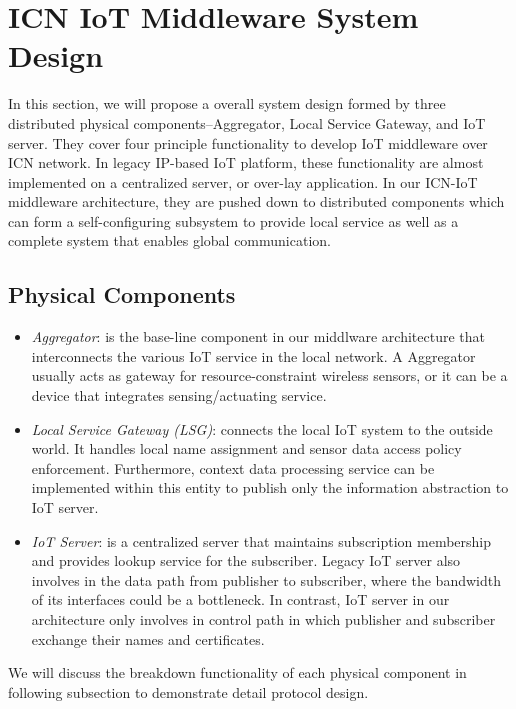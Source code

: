 \section{ICN IoT Middleware System Design}
In this section, we will propose a overall system design formed by three distributed physical components--Aggregator, Local Service Gateway, and IoT server. They cover four principle functionality to develop IoT middleware over ICN network. In legacy IP-based IoT platform, these functionality are almost implemented on a centralized server, or over-lay application. In our ICN-IoT middleware architecture, they are pushed down to distributed components which can form a self-configuring subsystem to provide local service as well as a complete system that enables global communication. 
\subsection{Physical Components}
\begin{itemize}
\vspace{-2pt}\item{\em Aggregator}:
is the base-line component in our middlware architecture that interconnects the various IoT service in the local network. A Aggregator usually acts as gateway for resource-constraint wireless sensors, or it can be a device that integrates sensing/actuating service. 
\vspace{-2pt}\item{\em Local Service Gateway (LSG)}:
connects the local IoT system to the outside world. It handles local name assignment and sensor data access policy enforcement. Furthermore, context data processing service can be implemented within this entity to publish only the information abstraction to IoT server.    
\vspace{-2pt}\item{\em IoT Server}:
is a centralized server that maintains subscription membership and provides lookup service for the subscriber. Legacy IoT server also involves in the data path from publisher to subscriber, where the bandwidth of its interfaces could be a bottleneck. In contrast, IoT server in our architecture only involves in control path in which publisher and subscriber exchange their names and certificates.  
\end{itemize}

We will discuss the breakdown functionality of each  physical component in following subsection to demonstrate detail protocol design.

